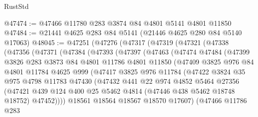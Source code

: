\begin{lexlean}{RustStd}
\begin{coremodule}
@47474 := @47466 @11780 @283 @3874 @84 @4801 @5141 @4801 @11850
@47484 := @21441 @4625 @283 @84 @5141 (@21446 @4625 @280 @84 @5140 @17063)
@48045 := @47251
    (@47276
      (@47317
        (@47319
          (@47321
            (@47338
              (@47356
                (@47371
                  (@47384
                    (@47393
                      (@47397
                        (@47463
                          (@47474
                            @47484
                            (@47399
                              @3826
                              @283
                              @3873
                              @84
                              @4801
                              @11786
                              @4801
                              @11850
                              (@47409
                                @3825
                                @976
                                @84
                                @4801
                                @11784
                                @4625
                                @999
                                (@47417
                                  @3825
                                  @976
                                  @11784
                                  (@47422
                                    @3824
                                    @35
                                    @975
                                    @4798
                                    @11783
                                    @47430
                                    (@47432
                                      @441
                                      @22
                                      @974
                                      @4852
                                      @5464
                                      @27356
                                      (@47421
                                        @439
                                        @124
                                        @400
                                        @25
                                        @5462
                                        @4814
                                        (@47446 @438 @5462 @18748 @18752)
                                        @47452))))
                                @18561
                                @18564
                                @18567
                                @18570
                                @17607)
                              (@47466
                                @11786
                                @283

\end{coremodule}
\end{lexlean}
